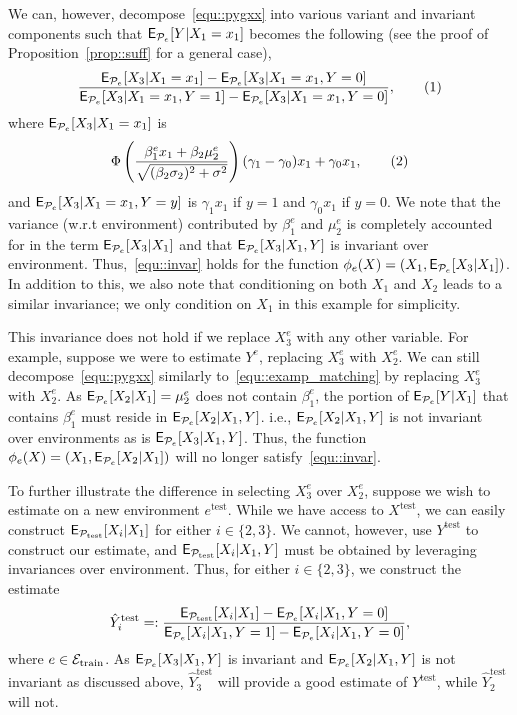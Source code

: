 \documentclass[conference,letterpaper]{IEEEtran}
\newcommand\numberthis{\addtocounter{equation}{1}\tag{\theequation}}
\begin{document}
We can, however, decompose~\eqref{equ::pygxx} into various variant and invariant components such that $\operatorname{\sf E}_{\mathcal{P}_e}[Y|X_1=x_1]$ becomes the following (see the proof of Proposition~\ref{prop::suff} for a general case),
\begin{align*}
     \frac{\E_{\Pc_e}[X_3|X_1=x_1] - \E_{\Pc_e}[X_3|X_1=x_1,Y=0]}{\E_{\Pc_e}[X_3|X_1=x_1,Y=1] - \E_{\Pc_e}[X_3|X_1=x_1,Y=0]}, \numberthis\label{equ::examp_matching}
\end{align*}
where $\operatorname{\sf E}_{\mathcal{P}_e}[X_3|X_1=x_1]$ is 
\begin{align*}
     \Phi\left(\frac{\beta_1^ex_1 + \beta_2\mu^e_2}{\sqrt{(\beta_2\sigma_2)^2 + \sigma^2}} \right) (\gamma_1 - \gamma_0)x_1 + \gamma_0x_1, \numberthis
\end{align*}
and $\operatorname{\sf E}_{\mathcal{P}_e}[X_3|X_1=x_1,Y=y]$ is $\gamma_1x_1$ if $y=1$ and $\gamma_0x_1$ if $y=0$. We note that the variance (w.r.t environment) contributed by $\beta_1^e$ and $\mu_2^e$ is completely accounted for in the term $\operatorname{\sf E}_{\mathcal{P}_e}[X_3|X_1]$ and that $\operatorname{\sf E}_{\mathcal{P}_e}[X_3|X_1,Y]$ is invariant over environment. Thus,~\eqref{equ::invar} holds for the function $\phi_e(X) = (X_1,\operatorname{\sf E}_{\mathcal{P}_e}[X_3|X_1])$. In addition to this, we also note that conditioning on both $X_1$ and $X_2$ leads to a similar invariance; we only condition on $X_1$ in this example for simplicity. 

This invariance does not hold if we replace $X^e_3$ with any other variable. For example, suppose we were to estimate $Y^e$, replacing $X^e_3$ with $X^e_2$. We can still decompose~\eqref{equ::pygxx} similarly to~\eqref{equ::examp_matching} by replacing $X^e_3$ with $X^e_2$. As $\operatorname{\sf E}_{\mathcal{P}_e}[X_2|X_1] = \mu^e_2$ does not contain $\beta_1^e$, the portion of $\operatorname{\sf E}_{\mathcal{P}_e}[Y|X_1]$ that contains $\beta_1^e$ must reside in $\operatorname{\sf E}_{\mathcal{P}_e}[X_2|X_1,Y]$. i.e., $\operatorname{\sf E}_{\mathcal{P}_e}[X_2|X_1,Y]$ is not invariant over environments as is $\operatorname{\sf E}_{\mathcal{P}_e}[X_3|X_1,Y]$. Thus, the function $\phi_e(X) = (X_1,\operatorname{\sf E}_{\mathcal{P}_e}[X_2|X_1])$ will no longer  satisfy~\eqref{equ::invar}. 


To further illustrate the difference in selecting $X_3^e$ over $X_2^e$, suppose we wish to estimate on a new environment $e^{\text{test}}$. While we have access to $X^{\text{test}}$, we can easily construct $\operatorname{\sf E}_{\mathcal{P}_{\text{test}}}[X_i|X_1]$ for either $i\in\{2,3\}$. We cannot, however, use $Y^{\text{test}}$ to construct our estimate, and $\operatorname{\sf E}_{\mathcal{P}_{\text{test}}}[X_i|X_1,Y]$ must be obtained by leveraging invariances over environment. Thus, for either $i\in\{2,3\}$, we construct the estimate 
\begin{equation}
    \hat{Y}^{\text{test}}_i =: \frac{\operatorname{\sf E}_{\mathcal{P}_{\text{test}}}[X_i|X_1]-\operatorname{\sf E}_{\mathcal{P}_e}[X_i|X_1,Y=0]}{\operatorname{\sf E}_{\mathcal{P}_e}[X_i|X_1,Y=1]-\operatorname{\sf E}_{\mathcal{P}_e}[X_i|X_1,Y=0]},
\end{equation}
where $e\in\mathcal{E}_{\text{train}}$. As $\operatorname{\sf E}_{\mathcal{P}_e}[X_3|X_1,Y]$ is invariant and $\operatorname{\sf E}_{\mathcal{P}_e}[X_2|X_1,Y]$ is not invariant as discussed above, $\hat{Y}^{\text{test}}_3$ will provide a good estimate of $Y^{\text{test}}$, while $\hat{Y}^{\text{test}}_2$ will not. 
\end{document}
